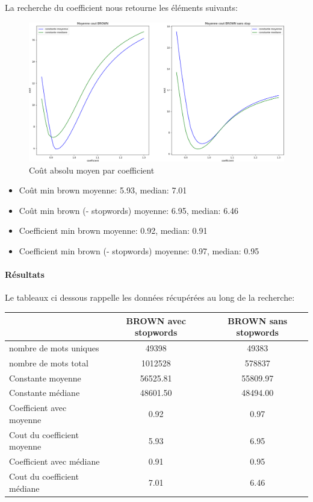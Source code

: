\documentclass[a4paper,12pt]{article}
\begin{document}
		La recherche du coefficient nous retourne les éléments suivants:
			\begin{figure}[H]
				\includegraphics[width=\linewidth]{img/coutZipf.png}
				\caption{Coût absolu moyen par coefficient}
			\end{figure}
		
			\begin{itemize}
				\item Coût min brown moyenne: 5.93, median: 7.01
				\item Coût min brown (- stopwords) moyenne: 6.95, median: 6.46
				\item Coefficient min brown moyenne: 0.92, median: 0.91
				\item Coefficient min brown (- stopwords) moyenne: 0.97, median: 0.95
			\end{itemize}
				
	\paragraph{Résultats}
		
		Le tableaux ci dessous rappelle les données récupérées au long de la recherche:
		\begin{center}
			\begin{tabular}{|l|c|c|}
				\hline
				& BROWN avec stopwords & BROWN sans stopwords \\
				\hline
				nombre de mots uniques & 49398 & 49383 \\
				\hline
				nombre de mots total & 1012528 & 578837 \\
				\hline
				Constante moyenne & 56525.81 & 55809.97 \\
				\hline
				Constante médiane & 48601.50 & 48494.00 \\
				\hline
				Coefficient avec moyenne & 0.92 & 0.97 \\
				\hline
				Cout du coefficient moyenne & 5.93 & 6.95 \\
				\hline
				Coefficient avec médiane & 0.91 & 0.95 \\
				\hline
				Cout du coefficient médiane & 7.01  & 6.46 \\
				\hline
			\end{tabular}		
		\end{center}
		
\end{document}
